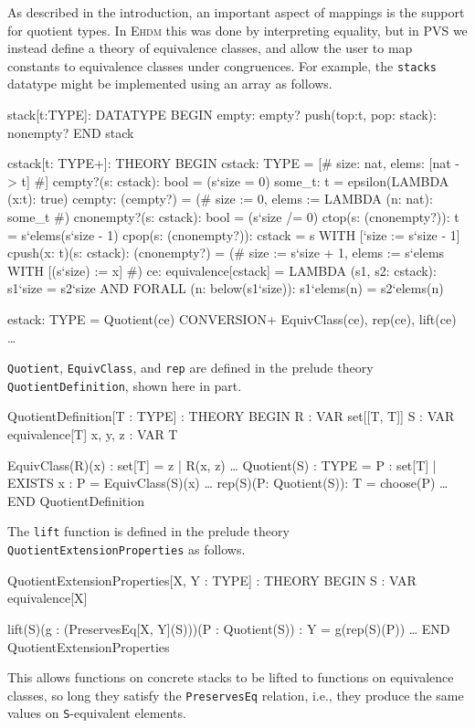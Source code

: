 \documentclass[11pt,twoside,openright,titlepage]{cslreport}
\begin{document}
As described in the introduction, an important aspect of mappings is the
support for quotient types.  In \textsc{Ehdm} this was done by
interpreting equality, but in PVS we instead define a theory of
equivalence classes, and allow the user to map constants to equivalence
classes under congruences.  For example, the \texttt{stacks} datatype
might be implemented using an array as follows.
\begin{session}
stack[t:TYPE]: DATATYPE
 BEGIN
  empty: empty?
  push(top:t, pop: stack): nonempty?
 END stack
\end{session}
\begin{session}\label{cstack}
cstack[t: TYPE+]: THEORY
 BEGIN
  cstack: TYPE = [# size: nat, elems: [nat -> t] #]
  cempty?(s: cstack): bool = (s`size = 0)
  some_t: t = epsilon(LAMBDA (x:t): true)
  cempty: (cempty?) =
    (# size := 0,
       elems := LAMBDA (n: nat): some_t #)
  cnonempty?(s: cstack): bool = (s`size /= 0)
  ctop(s: (cnonempty?)): t = s`elems(s`size - 1)
  cpop(s: (cnonempty?)): cstack = s WITH [`size := s`size - 1]
  cpush(x: t)(s: cstack): (cnonempty?) =
    (# size := s`size + 1,
       elems := s`elems WITH [(s`size) := x] #)
  ce: equivalence[cstack] =
    LAMBDA (s1, s2: cstack):
     s1`size = s2`size AND
     FORALL (n: below(s1`size)): s1`elems(n) = s2`elems(n)

  estack: TYPE = Quotient(ce)
  CONVERSION+ EquivClass(ce), rep(ce), lift(ce)
  \ldots
\end{session}
\texttt{Quotient}, \texttt{EquivClass}, and \texttt{rep} are defined in
the prelude theory \texttt{QuotientDefinition}, shown here in part.
\begin{session}
QuotientDefinition[T : TYPE] : THEORY
BEGIN
  R : VAR set[[T, T]]
  S : VAR equivalence[T]
  x, y, z : VAR T

  EquivClass(R)(x) : set[T] = { z | R(x, z) }
  \ldots
  Quotient(S) : TYPE =
    { P : set[T] | EXISTS x : P = EquivClass(S)(x) }
  \ldots
  rep(S)(P: Quotient(S)): T = choose(P)
  \ldots
END QuotientDefinition
\end{session}
The \texttt{lift} function is defined in the prelude theory
\texttt{QuotientExtensionProperties} as follows.
\begin{session}
QuotientExtensionProperties[X, Y : TYPE] : THEORY
BEGIN
  S : VAR equivalence[X]

  lift(S)(g : (PreservesEq[X, Y](S)))(P : Quotient(S)) : Y
    = g(rep(S)(P))
  \ldots
END QuotientExtensionProperties
\end{session}
This allows functions on concrete stacks to be lifted to functions on
equivalence classes, so long they satisfy the \texttt{PreservesEq}
relation, i.e., they produce the same values on \texttt{S}-equivalent
elements.
\end{document}
